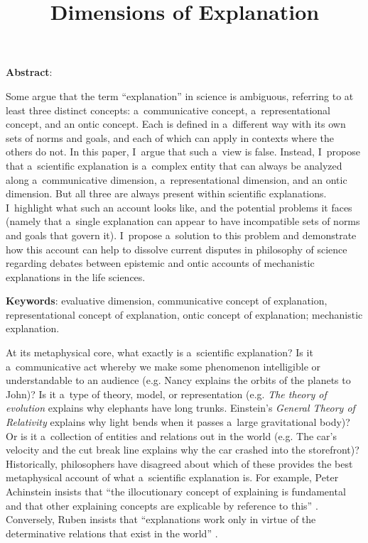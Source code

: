 

\title{Dimensions of Explanation}
\maketitle

\textbf{Abstract}:

Some argue that the term ``explanation'' in science is ambiguous, referring to at least three distinct concepts: a~communicative concept, a~representational concept, and an ontic concept. Each is defined in a~different way with its own sets of norms and goals, and each of which can apply in contexts where the others do not. In this paper, I~argue that such a~view is false. Instead, I~propose that a~scientific explanation is a~complex entity that can always be analyzed along a~communicative dimension, a~representational dimension, and an ontic dimension. But all three are always present within scientific explanations. I~highlight what such an account looks like, and the potential problems it faces (namely that a~single explanation can appear to have incompatible sets of norms and goals that govern it). I~propose a~solution to this problem and demonstrate how this account can help to dissolve current disputes in philosophy of science regarding debates between epistemic and ontic accounts of mechanistic explanations in the life sciences.

\textbf{Keywords}: evaluative dimension, communicative concept of explanation, representational concept of explanation, ontic concept of explanation; mechanistic explanation.

At its metaphysical core, what exactly is a~scientific explanation? Is it a~communicative act whereby we make some phenomenon intelligible or understandable to an audience (e.g. Nancy explains the orbits of the planets to John)? Is it a~type of theory, model, or representation (e.g. \textit{The theory of evolution} explains why elephants have long trunks. Einstein's \textit{General Theory of} \textit{Relativity} explains why light bends when it passes a~large gravitational body)? Or is it a~collection of entities and relations out in the world (e.g. The car's velocity and the cut break line explains why the car crashed into the storefront)? Historically, philosophers have disagreed about which of these provides the best metaphysical account of what a~scientific explanation is. For example, Peter Achinstein insists that ``the illocutionary concept of explaining is fundamental and that other explaining concepts are explicable by reference to this''
\parencite*[][p.22]{achinstein_pragmatic_1984}. %
 Conversely, Ruben insists that ``explanations work only in virtue of the determinative relations that exist in the world'' 
\parencite[][p.231]{ruben_explaining_1990}.%


